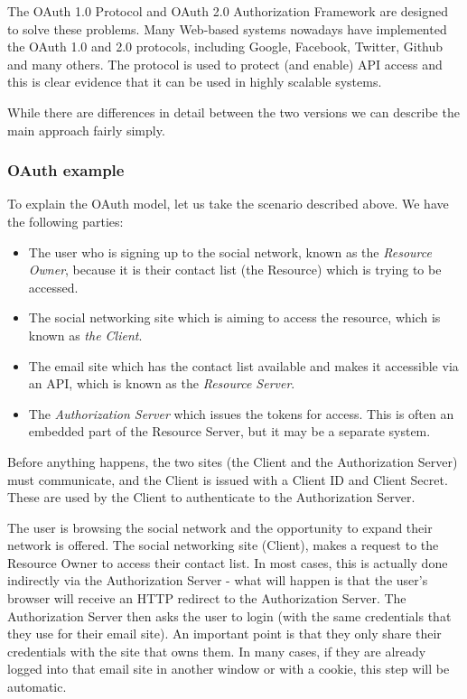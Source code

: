 \documentclass{llncs}
\newif\iflong
\begin{document}
The OAuth 1.0 Protocol and OAuth 2.0 Authorization Framework are designed to solve these
problems. Many Web-based systems nowadays have implemented the OAuth 1.0 and 2.0 protocols, including Google, 
Facebook, Twitter, Github and many others. The protocol is used to protect (and enable) API 
access and this is clear evidence that it can be used in highly scalable systems. 

\iflong

While there are differences in detail between the two versions we can describe the main approach fairly simply.

\subsubsection{OAuth example}
To explain the OAuth model, let us take the scenario described above. We have the following parties:
\begin{itemize}
\item The user who is signing up to the social network, known as the \emph{Resource Owner}, because it is 
their contact list (the Resource) which is trying to be accessed.
\item The social networking site which is aiming to access the resource, which is known as \emph{the Client}.
\item The email site which has the contact list available and makes it accessible via an API, which is known as the 
\emph{Resource Server}.
\item The \emph{Authorization Server} which issues the tokens for access. This is often an embedded 
part of the Resource Server, but it may be a separate system.
\end{itemize}

Before anything happens, the two sites (the Client and the Authorization Server) must 
communicate, and the Client is issued with a Client ID and Client Secret. These are used by 
the Client to authenticate to the Authorization Server.

The user is browsing the social network and the opportunity to expand their network is offered.
The social networking site (Client), makes a request to the Resource Owner to access their contact list. 
In most cases, this is actually done indirectly via the Authorization Server - what will happen is that 
the user's browser will receive an HTTP redirect to the Authorization Server. The Authorization Server then asks the user to 
login (with the same credentials that they use for their email site). An important point is that they only
share their credentials with the site that owns them. In many cases, if they are already logged into that
email site in another window or with a cookie, this step will be automatic.
\end{document}
